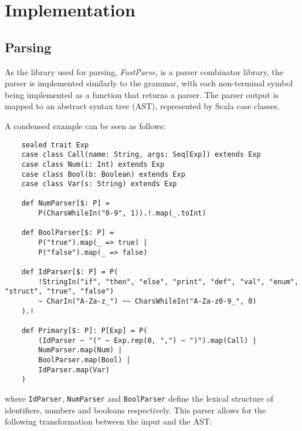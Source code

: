\chapter{Implementation}

\section{Parsing}

As the library used for parsing, \emph{FastParse}, is a parser combinator library, the parser is
implemented similarly to the grammar, with each non-terminal symbol being implemented as a function
that returns a parser. The parser output is mapped to an abstract syntax tree (AST), represented by
Scala case classes.

A condensed example can be seen as follows:

\begin{verbatim}
    sealed trait Exp
    case class Call(name: String, args: Seq[Exp]) extends Exp
    case class Num(i: Int) extends Exp
    case class Bool(b: Boolean) extends Exp
    case class Var(s: String) extends Exp

    def NumParser[$: P] =
        P(CharsWhileIn("0-9", 1)).!.map(_.toInt)

    def BoolParser[$: P] =
        P("true").map(_ => true) |
        P("false").map(_ => false)

    def IdParser[$: P] = P(
        !StringIn("if", "then", "else", "print", "def", "val", "enum", "struct", "true", "false")
        ~ CharIn("A-Za-z_") ~~ CharsWhileIn("A-Za-z0-9_", 0)
    ).!

    def Primary[$: P]: P[Exp] = P(
        (IdParser ~ "(" ~ Exp.rep(0, ",") ~ ")").map(Call) |
        NumParser.map(Num) |
        BoolParser.map(Bool) |
        IdParser.map(Var)
    )
\end{verbatim}

\noindent where \texttt{IdParser}, \texttt{NumParser} and \texttt{BoolParser} define the lexical
structure of identifiers, numbers and booleans respectively. This parser allows for the following
transformation between the input and the AST:

